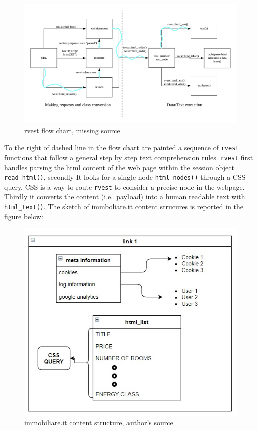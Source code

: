 \documentclass[
  12pt,
  a4paper,
  oneside]{book}
\theoremstyle{definition}
\theoremstyle{definition}
\theoremstyle{definition}
\theoremstyle{remark}
\begin{document}
\begin{figure}
\hypertarget{fig:workflow}{%
\centering
\includegraphics{images/workflow.png}
\caption{rvest flow chart, missing source}\label{fig:workflow}
}
\end{figure}

To the right of dashed line in the flow chart are painted a sequence of \texttt{rvest}\citep{rvest} functions that follow a general step by step text comprehension rules. \texttt{rvest} first handles parsing the html content of the web page within the session object \texttt{read\_html()}, secondly It looks for a single node \texttt{html\_nodes()} through a CSS query. CSS is a way to route \texttt{rvest} to consider a precise node in the webpage. Thirdly it converts the content (i.e.~payload) into a human readable text with \texttt{html\_text()}. The sketch of immboliare.it content strucures is reported in the figure below:

\begin{figure}
\centering
\includegraphics{images/content_structure.jpg}
\caption{immobiliare.it content structure, author's source}
\end{figure}
\end{document}
